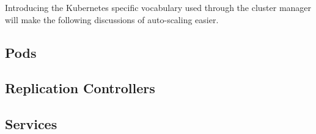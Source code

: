 Introducing the Kubernetes specific vocabulary used through the cluster manager
will make the following discussions of auto-scaling easier.

\subsection{Pods}



\subsection{Replication Controllers}



\subsection{Services}


